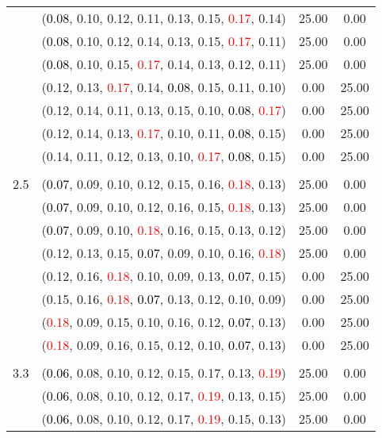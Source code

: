 \documentclass[10pt,a4paper]{report}
\begin{document}
\begin{center}
\begin{longtable}{clcc}
			&(\textcolor{black}{0.08}, 0.10, 0.12, 0.11, 0.13, 0.15, \textcolor{red}{0.17}, 0.14)&25.00&0.00\\
			&(\textcolor{black}{0.08}, 0.10, 0.12, 0.14, 0.13, 0.15, \textcolor{red}{0.17}, 0.11)&25.00&0.00\\
			&(\textcolor{black}{0.08}, 0.10, 0.15, \textcolor{red}{0.17}, 0.14, 0.13, 0.12, 0.11)&25.00&0.00\\
			&(0.12, 0.13, \textcolor{red}{0.17}, 0.14, \textcolor{black}{0.08}, 0.15, 0.11, 0.10)&0.00&25.00\\
			&(0.12, 0.14, 0.11, 0.13, 0.15, 0.10, \textcolor{black}{0.08}, \textcolor{red}{0.17})&0.00&25.00\\
			&(0.12, 0.14, 0.13, \textcolor{red}{0.17}, 0.10, 0.11, \textcolor{black}{0.08}, 0.15)&0.00&25.00\\
			&(0.14, 0.11, 0.12, 0.13, 0.10, \textcolor{red}{0.17}, \textcolor{black}{0.08}, 0.15)&0.00&25.00\\
		&&&\\
		2.5			&(\textcolor{black}{0.07}, 0.09, 0.10, 0.12, 0.15, 0.16, \textcolor{red}{0.18}, 0.13)&25.00&0.00\\
			&(\textcolor{black}{0.07}, 0.09, 0.10, 0.12, 0.16, 0.15, \textcolor{red}{0.18}, 0.13)&25.00&0.00\\
			&(\textcolor{black}{0.07}, 0.09, 0.10, \textcolor{red}{0.18}, 0.16, 0.15, 0.13, 0.12)&25.00&0.00\\
			&(0.12, 0.13, 0.15, \textcolor{black}{0.07}, 0.09, 0.10, 0.16, \textcolor{red}{0.18})&25.00&0.00\\
			&(0.12, 0.16, \textcolor{red}{0.18}, 0.10, 0.09, 0.13, \textcolor{black}{0.07}, 0.15)&0.00&25.00\\
			&(0.15, 0.16, \textcolor{red}{0.18}, \textcolor{black}{0.07}, 0.13, 0.12, 0.10, 0.09)&0.00&25.00\\
			&(\textcolor{red}{0.18}, 0.09, 0.15, 0.10, 0.16, 0.12, \textcolor{black}{0.07}, 0.13)&0.00&25.00\\
			&(\textcolor{red}{0.18}, 0.09, 0.16, 0.15, 0.12, 0.10, \textcolor{black}{0.07}, 0.13)&0.00&25.00\\
		&&&\\
		3.3			&(\textcolor{black}{0.06}, 0.08, 0.10, 0.12, 0.15, 0.17, 0.13, \textcolor{red}{0.19})&25.00&0.00\\
			&(\textcolor{black}{0.06}, 0.08, 0.10, 0.12, 0.17, \textcolor{red}{0.19}, 0.13, 0.15)&25.00&0.00\\
			&(\textcolor{black}{0.06}, 0.08, 0.10, 0.12, 0.17, \textcolor{red}{0.19}, 0.15, 0.13)&25.00&0.00\\

\end{longtable}
\end{center}
\end{document}
